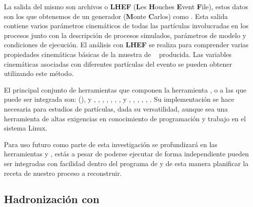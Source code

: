 
La salida del mismo son archivos  o \textbf{LHEF} (\textbf{L}es \textbf{H}ouches \textbf{E}vent \textbf{F}ile), estos datos son los que obtenemos de un generador \MC (\textbf{M}onte \textbf{C}arlos) como . Esta salida contiene varios parámetros cinemáticos de todas las partículas involucradas en los procesos junto con la descripción de procesos simulados, parámetros de modelo y condiciones de ejecución. El análisis con \textbf{LHEF} se realiza para comprender varias propiedades cinemáticas básicas de la muestra de \MC ~ producida. Las variables cinemáticas asociadas con diferentes partículas del evento se pueden obtener utilizando este método.


El principal conjunto de herramientas que componen la herramienta , o a las que puede ser integrada son: 
 (\cite{de_favereau_delphes_2014-1}), 
y  \citep{conte_madanalysis_2013}, 
,  \citep{binoth_precise_2008}, 
, 
, 
, 
 \citep{pythia8}, 
 y 
 \citep{buckley_lhapdf6_2015}, 
 \citep{denner_collier_2017}, 
, 
, 
, 
. 
Su implementación se hace necesaria para estudios de partículas, dada su versatilidad, aunque sea una herramienta de altas exigencias en conocimiento de programación y trabajo en el sistema Linux. 

Para uso futuro como parte de esta investigación se profundizará en las herramientas  y , estás a pesar de poderse ejecutar de forma independiente pueden ser integradas con facilidad dentro del programa de  y de esta manera planificar la receta de nuestro proceso a reconstruir.



\subsection{Hadronización con }\label{C_pythia8}

